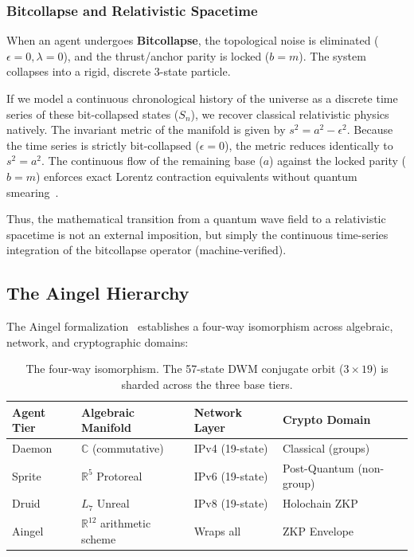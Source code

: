 \subsubsection{Bitcollapse and Relativistic Spacetime}
When an agent undergoes \textbf{Bitcollapse}, the topological noise is eliminated ($\epsilon = 0, \lambda = 0$), and the thrust/anchor parity is locked ($b = m$). The system collapses into a rigid, discrete 3-state particle. 

If we model a continuous chronological history of the universe as a discrete time series of these bit-collapsed states ($S_n$), we recover classical relativistic physics natively. The invariant metric of the manifold is given by $s^2 = a^2 - \epsilon^2$. Because the time series is strictly bit-collapsed ($\epsilon = 0$), the metric reduces identically to $s^2 = a^2$. The continuous flow of the remaining base ($a$) against the locked parity ($b=m$) enforces exact Lorentz contraction equivalents without quantum smearing~\cite{Einstein1905}.

Thus, the mathematical transition from a quantum wave field to a relativistic spacetime is not an external imposition, but simply the continuous time-series integration of the bitcollapse operator (machine-verified).



\subsection{The Aingel Hierarchy}

The Aingel formalization~\cite{Aingel} establishes a four-way isomorphism across algebraic, network, and cryptographic domains:

\begin{table}[H]
\centering
\begin{tabular}{@{}llll@{}}
\toprule
\textbf{Agent Tier} & \textbf{Algebraic Manifold} & \textbf{Network Layer} & \textbf{Crypto Domain} \\
\midrule
Daemon & $\mathbb{C}$ (commutative) & IPv4 (19-state) & Classical (groups) \\
Sprite & $\mathbb{R}^5$ Protoreal & IPv6 (19-state) & Post-Quantum (non-group) \\
Druid & $L_7$ Unreal & IPv8 (19-state) & Holochain ZKP \\
Aingel & $\mathbb{R}^{12}$ arithmetic scheme & Wraps all & ZKP Envelope \\
\bottomrule
\end{tabular}
\caption{The four-way isomorphism. The 57-state DWM conjugate orbit ($3 \times 19$) is sharded across the three base tiers.}
\end{table}

